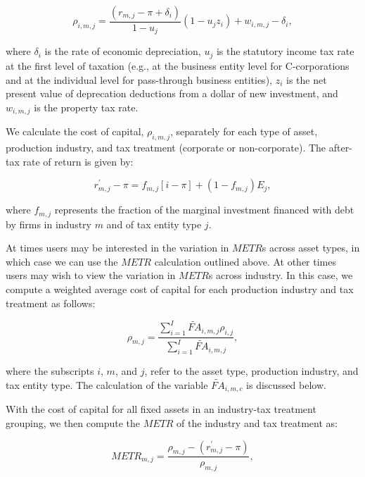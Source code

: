 \documentclass[article,11pt,letterpaper,fleqn]{article}
\theoremstyle{definition}
\numberwithin{equation}{section}
\begin{document}
\begin{equation}
\rho_{i,m,j} = \frac{(r_{m,j}-\pi+\delta_{i})}{1-u_{j}}(1-u_{j}z_{i})+w_{i,m,j}-\delta_{i},
\end{equation}  

\noindent\noindent where $\delta_{i}$ is the rate of economic depreciation, $u_{j}$ is the statutory income tax rate at the first level of taxation (e.g., at the business entity level for C-corporations and at the individual level for pass-through business entities), $z_{i}$ is the net present value of deprecation deductions from a dollar of new investment, and $w_{i,m,j}$ is the property tax rate.  


We calculate the cost of capital, $\rho_{i,m,j}$, separately for each type of asset, production industry, and tax treatment (corporate or non-corporate).  
The after-tax rate of return is given by:

\begin{equation}
r^{'}_{m,j}-\pi = f_{m,j}\left[i-\pi\right] + (1-f_{m,j})E_{j},
\end{equation}

\noindent\noindent where $f_{m,j}$ represents the fraction of the marginal investment financed with debt by firms in industry $m$ and of tax entity type $j$.


At times users may be interested in the variation in $METR$s across asset types, in which case we can use the $METR$ calculation outlined above. At other times users may wish to view the variation in $METR$s across industry.  In this case, we compute a weighted average cost of capital for each production industry and tax treatment as follows:

\begin{equation}
\rho_{m,j} = \frac{\sum_{i=1}^{I}\widetilde{FA}_{i,m,j}\rho_{i,j}}{\sum_{i=1}^{I}\widetilde{FA}_{i,m,j}} ,
\end{equation}

\noindent\noindent where the subscripts $i$, $m$, and $j$, refer to the asset type, production industry, and tax entity type.  The calculation of the variable $\widetilde{FA}_{i,m,c}$ is discussed below.

With the cost of capital for all fixed assets in an industry-tax treatment grouping, we then compute the $METR$ of the industry and tax treatment as:

\begin{equation}
METR_{m,j} =  \frac{\rho_{m,j} - (r^{'}_{m,j}-\pi)}{\rho_{m,j}},
\end{equation}
\end{document}
